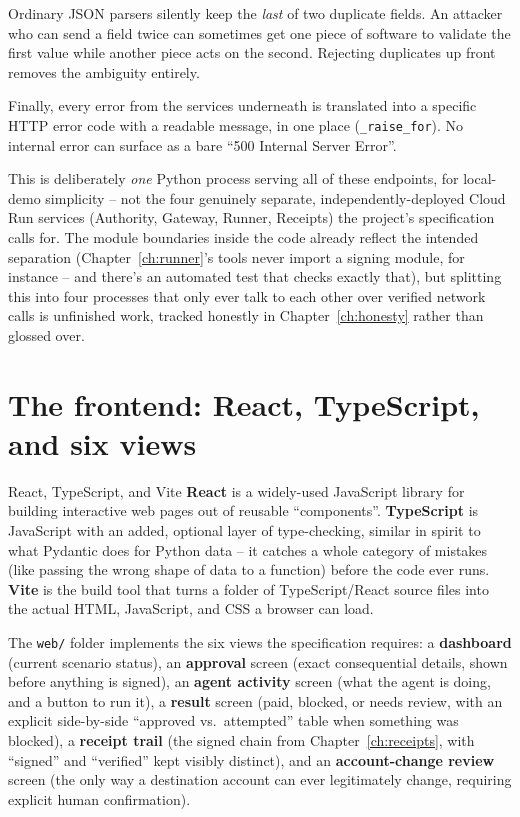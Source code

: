 \documentclass[11pt]{report}
\newcommand{\file}[1]{\texttt{#1}}
\newcommand{\code}[1]{\texttt{#1}}
\begin{document}
\begin{whyitmatters}
Ordinary JSON parsers silently keep the \emph{last} of two duplicate
fields. An attacker who can send a field twice can sometimes get one piece
of software to validate the first value while another piece acts on the
second. Rejecting duplicates up front removes the ambiguity entirely.
\end{whyitmatters}

Finally, every error from the services underneath is translated into a
specific HTTP error code with a readable message, in one place
(\code{\_raise\_for}). No internal error can surface as a bare
``500 Internal Server Error''.

\begin{honesty}
This is deliberately \emph{one} Python process serving all of these
endpoints, for local-demo simplicity -- not the four genuinely separate,
independently-deployed Cloud Run services (Authority, Gateway, Runner,
Receipts) the project's specification calls for. The module boundaries
inside the code already reflect the intended separation (Chapter~\ref{ch:runner}'s
tools never import a signing module, for instance -- and there's an
automated test that checks exactly that), but splitting this into four
processes that only ever talk to each other over verified network calls
is unfinished work, tracked honestly in Chapter~\ref{ch:honesty} rather
than glossed over.
\end{honesty}

\section{The frontend: React, TypeScript, and six views}

\begin{concept}{React, TypeScript, and Vite}
\textbf{React} is a widely-used JavaScript library for building
interactive web pages out of reusable ``components''. \textbf{TypeScript}
is JavaScript with an added, optional layer of type-checking, similar in
spirit to what Pydantic does for Python data -- it catches a whole
category of mistakes (like passing the wrong shape of data to a
function) before the code ever runs. \textbf{Vite} is the build tool
that turns a folder of TypeScript/React source files into the actual
HTML, JavaScript, and CSS a browser can load.
\end{concept}

The \file{web/} folder implements the six views the specification
requires: a \textbf{dashboard} (current scenario status), an
\textbf{approval} screen (exact consequential details, shown before
anything is signed), an \textbf{agent activity} screen (what the agent is
doing, and a button to run it), a \textbf{result} screen (paid, blocked,
or needs review, with an explicit side-by-side ``approved vs.\ attempted''
table when something was blocked), a \textbf{receipt trail} (the signed
chain from Chapter~\ref{ch:receipts}, with ``signed'' and ``verified''
kept visibly distinct), and an \textbf{account-change review} screen (the
only way a destination account can ever legitimately change, requiring
explicit human confirmation).
\end{document}
